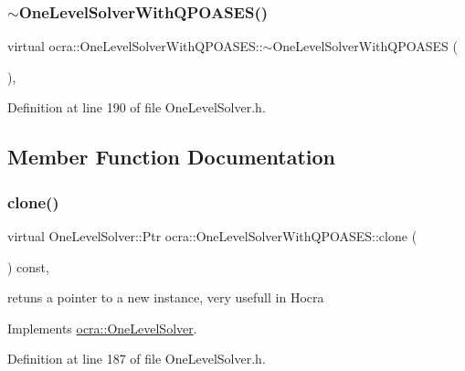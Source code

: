 \subsubsection{\texorpdfstring{$\sim$\+One\+Level\+Solver\+With\+Q\+P\+O\+A\+S\+E\+S()}{~OneLevelSolverWithQPOASES()}}
{\footnotesize\ttfamily virtual ocra\+::\+One\+Level\+Solver\+With\+Q\+P\+O\+A\+S\+E\+S\+::$\sim$\+One\+Level\+Solver\+With\+Q\+P\+O\+A\+S\+ES (\begin{DoxyParamCaption}{ }\end{DoxyParamCaption})\hspace{0.3cm}{\ttfamily [inline]}, {\ttfamily [virtual]}}



Definition at line 190 of file One\+Level\+Solver.\+h.



\subsection{Member Function Documentation}
\hypertarget{classocra_1_1OneLevelSolverWithQPOASES_ac92f5e6885ada1f68b2f3b31cacf43f5}{}\label{classocra_1_1OneLevelSolverWithQPOASES_ac92f5e6885ada1f68b2f3b31cacf43f5} 
\subsubsection{\texorpdfstring{clone()}{clone()}}
{\footnotesize\ttfamily virtual One\+Level\+Solver\+::\+Ptr ocra\+::\+One\+Level\+Solver\+With\+Q\+P\+O\+A\+S\+E\+S\+::clone (\begin{DoxyParamCaption}{ }\end{DoxyParamCaption}) const\hspace{0.3cm}{\ttfamily [inline]}, {\ttfamily [virtual]}}

retuns a pointer to a new instance, very usefull in Hocra 

Implements \hyperlink{classocra_1_1OneLevelSolver_a08ecd92d4295e03aa03075a71d481f48}{ocra\+::\+One\+Level\+Solver}.



Definition at line 187 of file One\+Level\+Solver.\+h.

\hypertarget{classocra_1_1OneLevelSolverWithQPOASES_aa2d1343a6e0f5c8913496c3384c0cd40}{}\label{classocra_1_1OneLevelSolverWithQPOASES_aa2d1343a6e0f5c8913496c3384c0cd40} 
